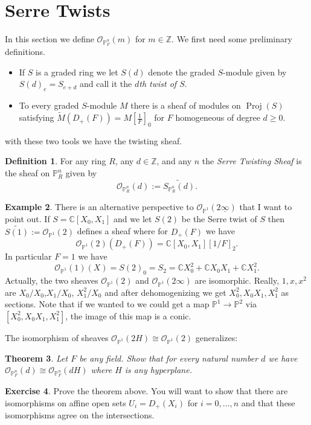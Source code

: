 \documentclass[12pt]{article}
\numberwithin{equation}{section}
\newtheorem{theorem}{Theorem}[subsection]
\theoremstyle{definition}
\newtheorem{definition}[theorem]{Definition}
\newtheorem{example}[theorem]{Example}
\newtheorem{exercise}[theorem]{Exercise}
\theoremstyle{remark}
\newcommand{\CC}{\mathbb{C}}
\newcommand{\ZZ}{\mathbb{Z}}
\newcommand{\Ocal}{\mathcal{O}}
\newcommand{\PP}{\mathbb{P}}
\newcommand{\Proj}{\operatorname{Proj}}
\begin{document}
\section{Serre Twists}
In this section we define $\Ocal_{\PP^n_F}(m)$ for $m \in \ZZ$. We first need some preliminary definitions.
\begin{itemize}
\item If $S$ is a graded ring we let $S(d)$ denote the graded $S$-module given by $S(d)_e = S_{e+d}$ and call it the \emph{$d$th twist of $S$}. 
\item To every graded $S$-module $M$ there is a sheaf of modules on $\Proj(S)$ satisfying $\widetilde{M}(D_+(F)) = M[\frac{1}{F}]_0$ for $F$ homogeneous of degree $d\geq 0$.
\end{itemize}
with these two tools we have the twisting sheaf.
\begin{definition}
	For any ring $R$, any $d\in \ZZ$, and any $n$ the \emph{Serre Twisting Sheaf} is the sheaf on $\PP^n_R$ given by 
	 $$\Ocal_{\PP^n_R}(d) := \widetilde{ S_{\PP^n_R}(d) }.$$
\end{definition} 


\begin{example}
	There is an alternative perspective to $\Ocal_{\PP^1}(2\underline{\infty})$ that I want to point out. 
	If $S = \CC[X_0,X_1]$ and we let $S(2)$ be the Serre twist of $S$ then $\widetilde{S(1)}:=\Ocal_{\PP^1}(2)$ defines a sheaf where for $D_+(F)$ we have 
	$$ \Ocal_{\PP^1}(2)(D_+(F)) = \CC[X_0,X_1][1/F]_2. $$
	In particular $F=1$ we have 
	$$ \Ocal_{\PP^1}(1)(X) = S(2)_0= S_2 = \CC X_0^2 + \CC X_0 X_1 + \CC X_1^2. $$
	Actually, the two sheaves $\Ocal_{\PP^1}(2)$ and $\Ocal_{\PP^1}(2\infty)$ are isomorphic. 
	Really, $1,x,x^2$ are $X_0/X_0$,$X_1/X_0$, $X_1^2/X_0$ and after dehomogenizing we get $X_0^2,X_0X_1,X_1^2$ as sections. 
	Note that if we wanted to we could get a map $\PP^1 \to \PP^2$ via $[X_0^2,X_0X_1,X_1^2]$, the image of this map is a conic.
\end{example}
The isomorphism of sheaves $\Ocal_{\PP^1}(2H) \cong \Ocal_{\PP^1}(2)$ generalizes:
\begin{theorem}
	Let $F$ be any field.
	Show that for every natural number $d$ we have $\Ocal_{\PP^n_F}(d) \cong \Ocal_{\PP^n_F}(dH)$ where $H$ is any hyperplane.
\end{theorem}

\begin{exercise}
	Prove the theorem above. 
	You will want to show that there are isomorphisms on affine open sets $U_i=D_+(X_i)$ for $i=0,\ldots, n$ and that these isomorphisms agree on the intersections.
\end{exercise}
\end{document}
